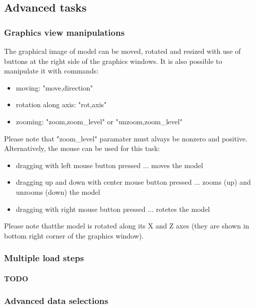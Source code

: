 \documentclass{article}
\begin{document}
\subsection{Advanced tasks}

\subsubsection{Graphics view manipulations}

 The graphical image of model can be moved, rotated and resized
 with use of buttons at the right side of the graphics
 windows. It is also possible to manipulate it with commands:


\begin{itemize}
\item  moving: "move,direction"
\item  rotation along axis: "rot,axis"
\item  zooming: "zoom,zoom\_level" or "unzoom,zoom\_level"
\end{itemize}

 Please note that "zoom\_level" paramater must alvays
 be nonzero and positive.
 Alternatively, the mouse can be used for this task:


\begin{itemize}
\item  dragging with left mouse button pressed ... moves the model
\item  dragging up and down with center mouse button pressed ... zooms (up) and unzooms (down) the model
\item  dragging with right mouse button pressed ... rotetes the model
\end{itemize}

 Please note thatthe model is rotated along its X and Z
 axes (they are shown in bottom right corner of the
 graphics window).



\subsubsection{Multiple load steps}

\paragraph{TODO}

\subsubsection{Advanced data selections}
\end{document}
